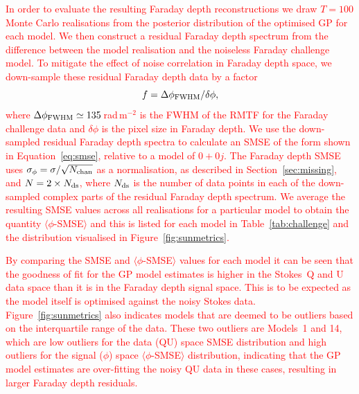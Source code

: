 \documentclass[fleqn,usenatbib]{mnras}
\begin{document}
%
%

\textcolor{red}{In order to evaluate the resulting Faraday depth reconstructions we draw $T=100$ Monte Carlo realisations from the posterior distribution of the optimised GP for each model. We then construct a residual Faraday depth spectrum from the difference between the model realisation and the noiseless Faraday challenge model. To mitigate the effect of noise correlation in Faraday depth space, we down-sample these residual Faraday depth data by a factor
%
\begin{equation}
    f = \Delta \phi_{\rm FWHM} / \delta \phi,
\end{equation}
%
where $\Delta \phi_{\rm FWHM} \simeq 135$\,rad\,m$^{-2}$ is the FWHM of the RMTF for the Faraday challenge data and $\delta \phi$ is the pixel size in Faraday depth. We use the down-sampled residual Faraday depth spectra to calculate an SMSE of the form shown in Equation~\ref{eq:smse},  relative to a model of $0 + 0j$. The Faraday depth SMSE uses $\sigma_{\phi} = \sigma /\sqrt{N_{\rm chan}}$ as a normalisation, as described in  Section~\ref{sec:missing}, and $N = 2\times N_{\rm ds}$, where $N_{\rm ds}$ is the number of data points in each of the down-sampled complex parts of the residual Faraday depth spectrum. We average the resulting SMSE values across all realisations for a particular model to obtain the quantity $\langle \phi$-SMSE$\rangle$ and this is listed for each model in Table~\ref{tab:challenge} and the distribution visualised in Figure~\ref{fig:sunmetrics}.}

\textcolor{red}{By comparing the SMSE and $\langle \phi$-SMSE$\rangle$ values for each model it can be seen that the goodness of fit for the GP model estimates is higher in the Stokes~Q and U data space than it is in the Faraday depth signal space. This is to be expected as the model itself is optimised against the noisy Stokes data. Figure~\ref{fig:sunmetrics} also indicates models that are deemed to be outliers based on the interquartile range of the data. These two outliers are Models~1 and 14, which are low outliers for the data (QU) space SMSE distribution and high outliers for the signal ($\phi$) space $\langle \phi$-SMSE$\rangle$ distribution, indicating that the GP model estimates are over-fitting the noisy QU data in these cases, resulting in larger Faraday depth residuals.}
\end{document}

